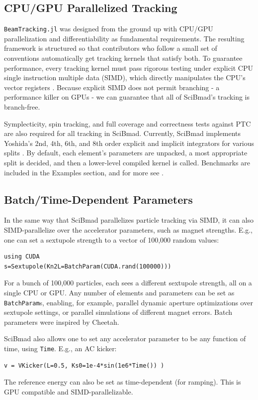 \documentclass[a4paper,
               biblatex,     %
               ]{jacow}
\begin{document}
\subsection{CPU/GPU Parallelized Tracking}
\texttt{BeamTracking.jl} was designed from the ground up with CPU/GPU parallelization and differentiability as fundamental requirements. The resulting framework is structured so that contributors who follow a small set of conventions automatically get tracking kernels that satisfy both. To guarantee performance, every tracking kernel must pass rigorous testing under explicit CPU single instruction multiple data (SIMD), which directly manipulates the CPU's vector registers \cite{simd}. Because explicit SIMD does not permit branching - a performance killer on GPUs - we can guarantee that all of SciBmad's tracking is branch-free.

Symplecticity, spin tracking, and full coverage and correctness tests against PTC are also required for all tracking in SciBmad. Currently, SciBmad implements Yoshida's 2nd, 4th, 6th, and 8th order explicit and implicit integrators for various splits \cite{yoshida1990construction}. By default, each element's parameters are unpacked, a most appropriate split is decided, and then a lower-level compiled kernel is called. Benchmarks are included in the Examples section, and for more see \cite{joe}.

\subsection{Batch/Time-Dependent Parameters}
In the same way that SciBmad parallelizes particle tracking via SIMD, it can also SIMD-parallelize over the accelerator parameters, such as magnet strengths. E.g., one can set a sextupole strength to a vector of 100,000 random values:
\begin{verbatim}
using CUDA
s=Sextupole(Kn2L=BatchParam(CUDA.rand(100000)))
\end{verbatim}
For a bunch of 100,000 particles, each sees a different sextupole strength, all on a single CPU or GPU. Any number of elements and parameters can be set as \texttt{BatchParam}s, enabling, for example, parallel dynamic aperture optimizations over sextupole settings, or parallel simulations of different magnet errors. Batch parameters were inspired by Cheetah.

SciBmad also allows one to set any accelerator parameter to be any function of time, using \texttt{Time}. E.g., an AC kicker:
\begin{verbatim}
v = VKicker(L=0.5, Ks0=1e-4*sin(1e6*Time()) )
\end{verbatim}
The reference energy can also be set as time-dependent (for ramping). This is GPU compatible and SIMD-parallelizable. %
\end{document}
